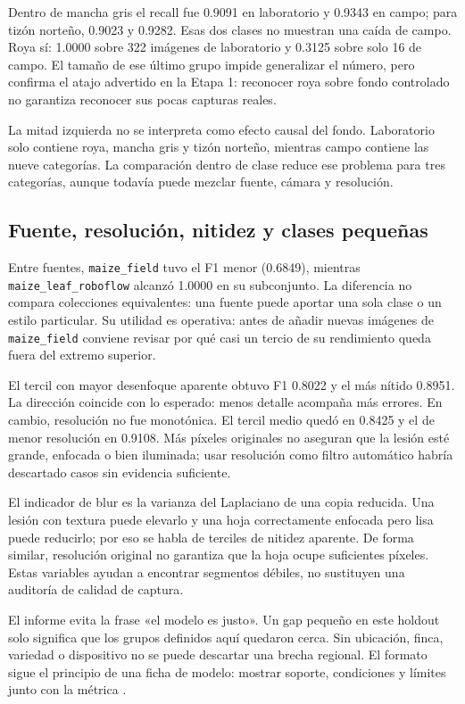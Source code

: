 Dentro de mancha gris el recall fue 0.9091 en laboratorio y 0.9343 en campo;
para tizón norteño, 0.9023 y 0.9282. Esas dos clases no muestran una caída de
campo. Roya sí: 1.0000 sobre 322 imágenes de laboratorio y 0.3125 sobre solo 16
de campo. El tamaño de ese último grupo impide generalizar el número, pero
confirma el atajo advertido en la Etapa 1: reconocer roya sobre fondo controlado
no garantiza reconocer sus pocas capturas reales.

La mitad izquierda no se interpreta como efecto causal del fondo. Laboratorio
solo contiene roya, mancha gris y tizón norteño, mientras campo contiene las
nueve categorías. La comparación dentro de clase reduce ese problema para tres
categorías, aunque todavía puede mezclar fuente, cámara y resolución.

\subsection{Fuente, resolución, nitidez y clases pequeñas}

Entre fuentes, \texttt{maize\_field} tuvo el F1 menor (0.6849), mientras
\texttt{maize\_leaf\_roboflow} alcanzó 1.0000 en su subconjunto. La diferencia
no compara colecciones equivalentes: una fuente puede aportar una sola clase o
un estilo particular. Su utilidad es operativa: antes de añadir nuevas imágenes
de \texttt{maize\_field} conviene revisar por qué casi un tercio de su rendimiento
queda fuera del extremo superior.

El tercil con mayor desenfoque aparente obtuvo F1 0.8022 y el más nítido 0.8951.
La dirección coincide con lo esperado: menos detalle acompaña más errores. En
cambio, resolución no fue monotónica. El tercil medio quedó en 0.8425 y el de
menor resolución en 0.9108. Más píxeles originales no aseguran que la lesión
esté grande, enfocada o bien iluminada; usar resolución como filtro automático
habría descartado casos sin evidencia suficiente.

El indicador de blur es la varianza del Laplaciano de una copia reducida. Una
lesión con textura puede elevarlo y una hoja correctamente enfocada pero lisa
puede reducirlo; por eso se habla de terciles de nitidez aparente. De forma
similar, resolución original no garantiza que la hoja ocupe suficientes
píxeles. Estas variables ayudan a encontrar segmentos débiles, no sustituyen
una auditoría de calidad de captura.

El informe evita la frase «el modelo es justo». Un gap pequeño en este holdout
solo significa que los grupos definidos aquí quedaron cerca. Sin ubicación,
finca, variedad o dispositivo no se puede descartar una brecha regional. El
formato sigue el principio de una ficha de modelo: mostrar soporte, condiciones
y límites junto con la métrica \citep{mitchell2019modelcards}.
